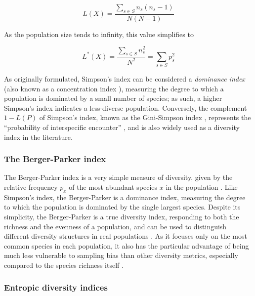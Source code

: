 \begin{equation}
L(X) = \frac{\sum_{s \in S} n_s(n_s-1)}{N(N-1)}
\label{eq:simpson_finite}
\end{equation} 

\noindent As the population size tends to infinity, this value simplifies to

\begin{equation}
L^*(X) = \frac{\sum_{s \in S} n_s^2}{N^2} = \sum_{s \in S} p_s^2
\label{eq:simpson_finite}
\end{equation} 

\noindent As originally formulated, Simpson's index can be considered a \textit{dominance index} (also known as a concentration  index \citep{simpson1949diversity}), measuring the degree to which a population is dominated by a small number of species; as such, a higher Simpson's index indicates a less-diverse population. Conversely, the complement $1-L(P)$ of Simpson's index, known as the Gini-Simpson index \citep{jost2006entropy}, represents the ``probability of interspecific encounter'' \citep{peet1974diversity}, and is also widely used as a diversity index in the literature.

\subsubsection{The Berger-Parker index}
\label{app:diversity-unitary-simple-berger}

The Berger-Parker index is a very simple measure of diversity, given by the relative frequency $p_x$ of the most abundant species $x$ in the population \parencite{berger1970diversity,caruso2008bergerparker}. Like Simpson's index, the Berger-Parker is a dominance index, measuring the degree to which the population is dominated by the single largest species. Despite its simplicity, the Berger-Parker is a true diversity index, responding to both the richness and the evenness of a population, and can be used to distinguish different diversity structures in real populations \parencite{caruso2008bergerparker}. As it focuses only on the most common species in each population, it also has the particular advantage of being much less vulnerable to sampling bias than other diversity metrics, especially compared to the species richness itself \parencite{berger1970diversity}.

\subsubsection{Entropic diversity indices}
\label{app:diversity-unitary-simple-entropy}

